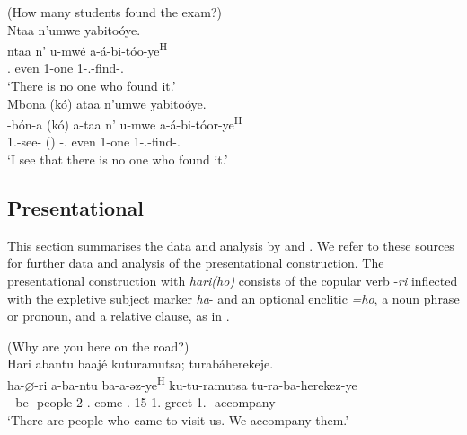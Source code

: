 \documentclass[output=paper]{langscibook}
\begin{document}
\ea
(How many students found the exam?)\\
\ea
\label{bkm:Ref73956939}
Ntaa n’umwe yabitoóye.\\
\gll
ntaa  n’  u-mwé  a-á-bi-tóo-ye\textsuperscript{H}\\
\NEG.\COP{}  even  1-one  1\SM-\RMT.\OM-{}find-\PFV.\REL{}\\
\glt
‘There is no one who found it.’\\

\ex
\label{bkm:Ref73719164}
Mbona (kó) ataa n’umwe yabitoóye.\\
\gll
\N{}-bón-a  (kó)  a-taa  n’  u-mwe  a-á-bi-tóor-ye\textsuperscript{H}\\
1\SG.\SM{}-see-\FV{}  (\COMP{})  \EXP-\NEG.\COP{}  even  1-one  1\SM-\RMT.\OM-{}find-\PFV.\REL{}\\
\glt
‘I see that there is no one who found it.’\\

\z
\z

\subsection{Presentational}
\label{bkm:Ref75348623}
This section summarises the data and analysis by \citet[chapter~6]{Nshemezimana2016} and \citet{NshemezimanaMberamihigo2021}. We refer to these sources for further data and analysis of the presentational construction. The presentational construction with \textit{hari(ho)} consists of the copular verb -\textit{ri} inflected with the expletive subject marker \textit{ha}- and an optional enclitic \textit{=ho}, a noun phrase or pronoun, and a relative clause, as in .

\ea
\label{bkm:Ref74054848}
(Why are you here on the road?)\\
Hari abantu baajé kuturamutsa; turabáherekeje.\\
\gll
ha-$\varnothing$-ri  a-ba-ntu  ba-a-əz-ye\textsuperscript{H}  ku-tu-ramutsa   tu-ra-ba-herekez-ye \\
\EXP{}-\PRS{}-be  -{}people  2\SM-\N.\PST-{}come-\PFV.\REL{}  15-1\PL.\OM{}-greet   1\PL.\SM-\OM-{}accompany-\PFV{} \\
\glt
  ‘There are people who came to visit us. We accompany them.’\\
\end{document}
